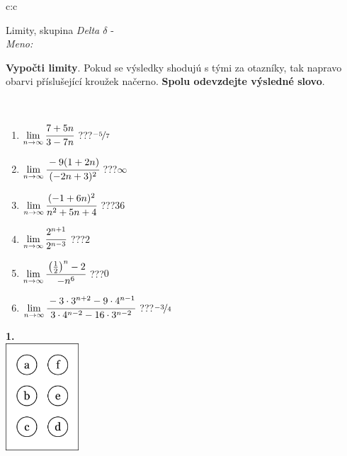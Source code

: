 \documentclass[10pt]{report}
\begin{document}
\begin{tabular}{c:c}
\begin{minipage}[c][104.5mm][t]{0.5\linewidth}
\begin{center}
\vspace{7mm}
{\huge Limity, skupina \textit{Delta $\delta$} -}\\[5mm]
\textit{Meno:}\phantom{xxxxxxxxxxxxxxxxxxxxxxxxxxxxxxxxxxxxxxxxxxxxxxxxxxxxxxxxxxxxxxxxx}\\[5mm]
\begin{minipage}{0.95\linewidth}
\begin{center}
\textbf{Vypočti limity}. Pokud se výsledky shodujú s tými za otazníky, tak napravo\\obarvi příslušející kroužek načerno. \textbf{Spolu odevzdejte výsledné slovo}.
\end{center}
\end{minipage}
\\[1mm]
\begin{minipage}{0.79\linewidth}
\begin{center}
\begin{varwidth}{\linewidth}
\begin{enumerate}
\normalsize
\item $\lim\limits_{n\to\infty}\cfrac{7+5n}{3-7n}$\quad \dotfill\; ???\;\dotfill \quad $\nicefrac{-5}{7}$
\item $\lim\limits_{n\to\infty}\cfrac{-9(1+2n)}{(-2n+3)^2}$\quad \dotfill\; ???\;\dotfill \quad $\infty$
\item $\lim\limits_{n\to\infty}\cfrac{(-1+6n)^2}{n^2+5n+4}$\quad \dotfill\; ???\;\dotfill \quad $36$
\item $\lim\limits_{n\to\infty}\cfrac{2^{n+1}}{2^{n-3}}$\quad \dotfill\; ???\;\dotfill \quad $2$
\item $\lim\limits_{n\to\infty}\cfrac{\left(\frac{1}{2}\right)^n -2}{-n^{6}}$\quad \dotfill\; ???\;\dotfill \quad $0$
\item $\lim\limits_{n\to\infty}\cfrac{-3\cdot 3^{n+2}-9\cdot 4^{n-1}}{3\cdot 4^{n-2}-16\cdot 3^{n-2}}$\quad \dotfill\; ???\;\dotfill \quad $\nicefrac{-3}{4}$
\end{enumerate}
\end{varwidth}
\end{center}
\end{minipage}
\begin{minipage}{0.20\linewidth}
\begin{center}
{\Huge\bfseries 1.} \\[2mm]
\includegraphics[height=40mm]{../images/braille.png}

\end{center}
\end{minipage}
\end{center}
\end{minipage}
\end{tabular}
\end{document}
